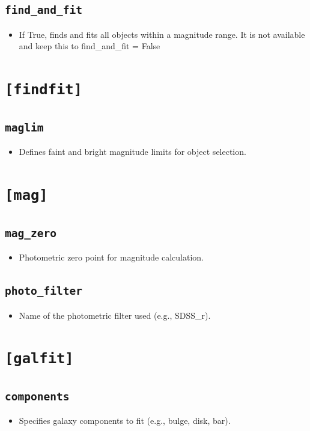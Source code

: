 \documentclass[11pt]{article}
\begin{document}
\subsection{\texttt{find\_and\_fit}}
\begin{itemize}
\item If True, finds and fits all objects within a magnitude range. It is not available and keep this  
to find\_and\_fit = False
\end{itemize}

\section{\texttt{[findfit]}}

\subsection{\texttt{maglim}}
\begin{itemize}
\item Defines faint and bright magnitude limits for object selection.
\end{itemize}

\section{\texttt{[mag]}}

\subsection{\texttt{mag\_zero}}
\begin{itemize}
\item Photometric zero point for magnitude calculation.
\end{itemize}

\subsection{\texttt{photo\_filter}}
\begin{itemize}
\item Name of the photometric filter used (e.g., SDSS\_r).
\end{itemize}

\section{\texttt{[galfit]}}

\subsection{\texttt{components}}
\begin{itemize}
\item Specifies galaxy components to fit (e.g., bulge, disk, bar).
\end{itemize}
\end{document}
